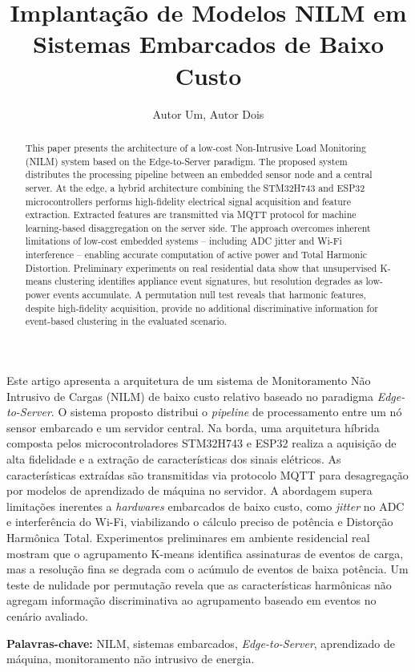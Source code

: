 \documentclass[12pt]{article}
\title{Implanta\c{c}\~ao de Modelos NILM em Sistemas Embarcados de Baixo Custo}
\author{Autor Um\inst{1}, Autor Dois\inst{1}}
\begin{document}
\maketitle

\begin{abstract}
  This paper presents the architecture of a low-cost Non-Intrusive Load
  Monitoring (NILM) system based on the Edge-to-Server paradigm. The proposed
  system distributes the processing pipeline between an embedded sensor node
  and a central server. At the edge, a hybrid architecture combining the
  STM32H743 and ESP32 microcontrollers performs high-fidelity electrical
  signal acquisition and feature extraction. Extracted features are transmitted
  via MQTT protocol for machine learning-based disaggregation on the server
  side. The approach overcomes inherent limitations of low-cost embedded
  systems -- including ADC jitter and Wi-Fi interference -- enabling accurate
  computation of active power and Total Harmonic Distortion.
  Preliminary experiments on real residential data show that unsupervised
  K-means clustering identifies appliance event signatures, but resolution
  degrades as low-power events accumulate. A permutation null test reveals that
  harmonic features, despite high-fidelity acquisition, provide no additional
  discriminative information for event-based clustering in the evaluated
  scenario.
\end{abstract}

\begin{resumo}
  Este artigo apresenta a arquitetura de um sistema de Monitoramento N\~ao
  Intrusivo de Cargas (NILM) de baixo custo relativo baseado no paradigma
  \textit{Edge-to-Server}. O sistema proposto distribui o \textit{pipeline} de
  processamento entre um n\'o sensor embarcado e um servidor central. Na borda,
  uma arquitetura h\'ibrida composta pelos microcontroladores STM32H743 e ESP32
  realiza a aquisi\c{c}\~ao de alta fidelidade e a extra\c{c}\~ao de
  caracter\'isticas dos sinais el\'etricos. As caracter\'isticas extra\'idas
  s\~ao transmitidas via protocolo MQTT para desagrega\c{c}\~ao por modelos de
  aprendizado de m\'aquina no servidor. A abordagem supera limita\c{c}\~oes
  inerentes a \textit{hardwares} embarcados de baixo custo, como \textit{jitter}
  no ADC e interfer\^encia do Wi-Fi, viabilizando o c\'alculo preciso de
  pot\^encia e Distor\c{c}\~ao Harm\^onica Total.
  Experimentos preliminares em ambiente residencial real mostram que o
  agrupamento K-means identifica assinaturas de eventos de carga, mas a
  resolu\c{c}\~ao fina se degrada com o ac\'umulo de eventos de baixa pot\^encia.
  Um teste de nulidade por permuta\c{c}\~ao revela que as caracter\'isticas
  harm\^onicas n\~ao agregam informa\c{c}\~ao discriminativa ao agrupamento
  baseado em eventos no cen\'ario avaliado.

  \textbf{Palavras-chave:} NILM, sistemas embarcados, \textit{Edge-to-Server},
  aprendizado de m\'aquina, monitoramento n\~ao intrusivo de energia.
\end{resumo}
\end{document}
